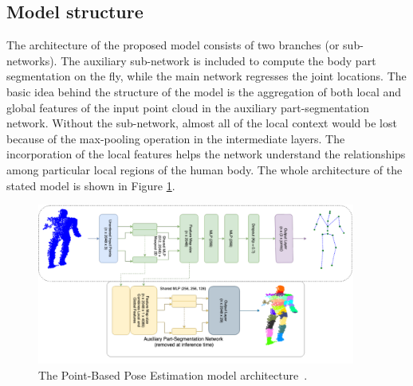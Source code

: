 \subsection{Model structure}
The architecture of the proposed model consists of two branches (or sub-networks). The auxiliary sub-network is included to compute the body part segmentation on the fly, while the main network regresses the joint locations. The basic idea behind the structure of the model is the aggregation of both local and global features of the input point cloud in the auxiliary part-segmentation network. Without the sub-network, almost all of the local context would be lost because of the max-pooling operation in the intermediate layers. The incorporation of the local features helps the network understand the relationships among particular local regions of the human body. The whole architecture of the stated model is shown in Figure \ref{fig:PBPE}.\par
\vspace{5mm}

\begin{figure}[H]
\begin{center}
  \includegraphics[height=200px]{images/implementation/pbpe2.PNG}
  \caption{The Point-Based Pose Estimation model architecture~\cite{Ali19}.}
  \label{fig:PBPE}
\end{center}
\end{figure}

